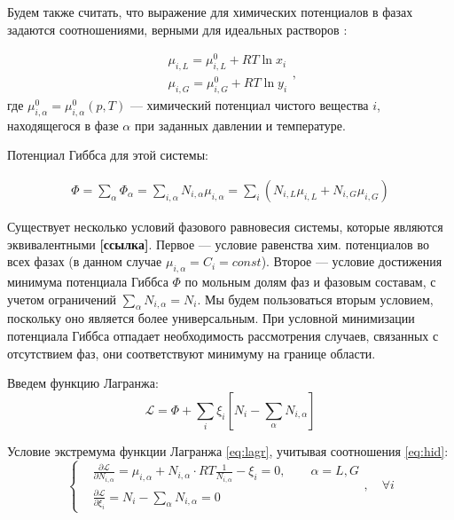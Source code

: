 ﻿\documentclass[12pt]{article}
\newcommand{\pd}[2]{\frac{\partial #1}{\partial #2}}
\begin{document}
Будем также считать, что выражение для химических потенциалов в фазах задаются соотношениями, верными для идеальных
растворов \cite{Prigozhin}:

\begin{equation}
\begin{aligned}
\mu_{i,L} = \mu_{i,L}^0 + RT \ln x_i \\
\mu_{i,G} = \mu_{i,G}^0 + RT \ln y_i
\end{aligned},
\label{eq:hid}
\end{equation}
где $\mu_{i,\alpha}^0 = \mu_{i,\alpha}^0(p, T)$ --- химический потенциал чистого вещества $i$, находящегося в фазе
$\alpha$ при заданных давлении и температуре.

Потенциал Гиббса для этой системы:

\begin{equation}
\begin{aligned}
\Phi = \sum_\alpha \Phi_\alpha = \sum_{i, \alpha}{N_{i,\alpha} \mu_{i,\alpha}} = \sum_i \left(N_{i, L} \mu_{i, L} +
N_{i, G} \mu_{i, G}\right)
\end{aligned}
\label{eq:gibbs}
\end{equation}

Существует несколько условий фазового равновесия системы, которые являются эквивалентными \textbf{[ссылка]}. Первое ---
условие равенства хим. потенциалов во всех фазах (в данном случае $\mu_{i, \alpha} = C_i = const$). Второе --- условие
достижения минимума потенциала Гиббса $\Phi$ по мольным долям фаз и фазовым составам, с учетом ограничений $\sum_\alpha
N_{i, \alpha} = N_i$. Мы будем пользоваться вторым условием, поскольку оно является более универсальным. При условной
минимизации потенциала Гиббса отпадает необходимость рассмотрения случаев, связанных с отсутствием фаз, они
соответствуют минимуму на границе области.

Введем функцию Лагранжа:
\begin{equation}
\mathscr{L} = \Phi + \sum_i{\xi_i \left[N_i - \sum_\alpha N_{i, \alpha} \right]} \label{eq:lagr}
\end{equation}


Условие экстремума функции Лагранжа \eqref{eq:lagr}, учитывая соотношения \eqref{eq:hid}:
\[
\left\{
\begin{aligned}
& \pd{\mathscr{L}}{N_{i, \alpha}} = \mu_{i, \alpha} + N_{i, \alpha} \cdot RT \frac{1}{N_{i, \alpha}} - \xi_i = 0, \qquad \alpha=L, G \\
& \pd{\mathscr{L}}{\xi_i} = N_i - \sum_{\alpha} N_{i,\alpha} = 0
\end{aligned}
\right.,\quad\forall i
\]
\end{document}
